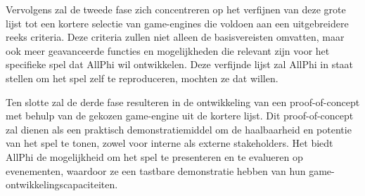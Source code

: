 Vervolgens zal de tweede fase zich concentreren op het verfijnen van deze grote lijst tot een kortere selectie van game-engines die voldoen aan een uitgebreidere reeks criteria. Deze criteria zullen niet alleen de basisvereisten omvatten, maar ook meer geavanceerde functies en mogelijkheden die relevant zijn voor het specifieke spel dat AllPhi wil ontwikkelen. Deze verfijnde lijst zal AllPhi in staat stellen om het spel zelf te reproduceren, mochten ze dat willen.

Ten slotte zal de derde fase resulteren in de ontwikkeling van een proof-of-concept met behulp van de gekozen game-engine uit de kortere lijst. Dit proof-of-concept zal dienen als een praktisch demonstratiemiddel om de haalbaarheid en potentie van het spel te tonen, zowel voor interne als externe stakeholders. Het biedt AllPhi de mogelijkheid om het spel te presenteren en te evalueren op evenementen, waardoor ze een tastbare demonstratie hebben van hun game-ontwikkelingscapaciteiten.


